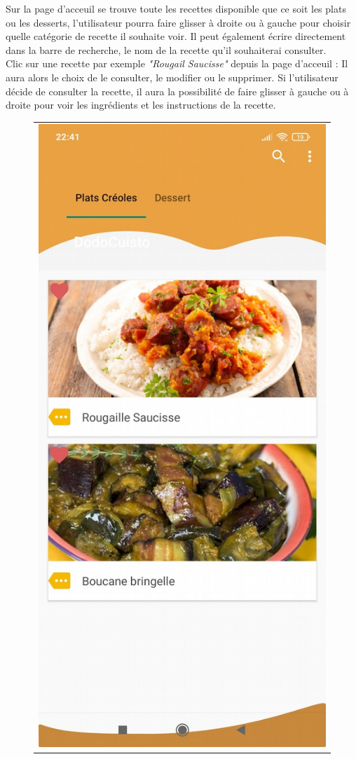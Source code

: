 \documentclass{article}
\begin{document}
Sur la page d’acceuil se trouve toute les recettes disponible que ce soit les plats ou les desserts, l’utilisateur pourra faire glisser à droite ou à gauche pour choisir quelle catégorie de recette il souhaite voir. Il peut également écrire directement dans la barre de recherche, le nom de la recette
qu’il souhaiterai consulter.\\

Clic sur une recette par exemple \textit{"Rougail Saucisse"} depuis la page d’acceuil :
Il aura alors le choix de le consulter, le modifier ou le supprimer.
Si l’utilisateur décide de consulter la recette, il aura la possibilité de faire glisser à gauche ou à droite pour voir les ingrédients et les instructions de la recette.

\begin{figure}
    \centering
    \begin{tabular}{@{}c@{}}
        \includegraphics[scale=0.152]{acceuil.png}

\end{tabular}
\end{figure}
\end{document}
